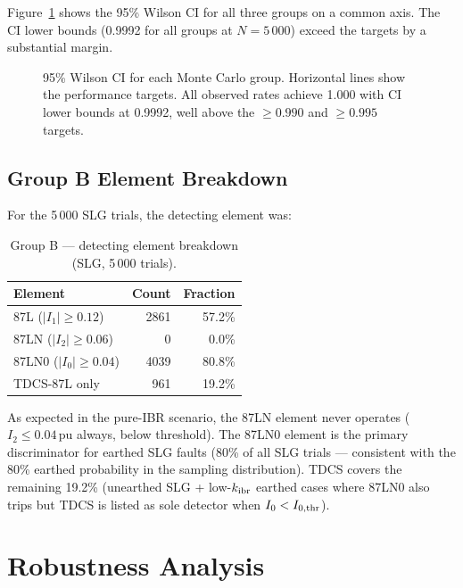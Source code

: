 \documentclass[11pt,a4paper]{article}
\begin{document}
Figure~\ref{fig:ci} shows the 95\% Wilson CI for all three groups
on a common axis.  The CI lower bounds (0.9992 for all groups at
$N = 5\,000$) exceed the targets by a substantial margin.

\begin{figure}[h!]
  \centering
  
  \caption{95\% Wilson CI for each Monte Carlo group.  Horizontal lines
           show the performance targets.  All observed rates achieve
           1.000 with CI lower bounds at 0.9992, well above the
           $\geq 0.990$ and $\geq 0.995$ targets.}
  \label{fig:ci}
\end{figure}

\subsection{Group B Element Breakdown}

For the 5\,000 SLG trials, the detecting element was:

\begin{table}[h!]
\centering
\caption{Group B — detecting element breakdown (SLG, 5\,000 trials).}
\label{tab:group_b}
\begin{tabular}{lrr}
\toprule
Element & Count & Fraction \\
\midrule
87L ($|I_1| \geq 0.12$)   & 2861 & 57.2\% \\
87LN ($|I_2| \geq 0.06$)  &    0 &  0.0\% \\
87LN0 ($|I_0| \geq 0.04$) & 4039 & 80.8\% \\
TDCS-87L only              &  961 & 19.2\% \\
\bottomrule
\end{tabular}
\end{table}

As expected in the pure-IBR scenario, the 87LN element never operates
($I_2 \leq 0.04$\,pu always, below threshold).  The 87LN0 element is the
primary discriminator for earthed SLG faults (80\% of all SLG trials —
consistent with the 80\% earthed probability in the sampling distribution).
TDCS covers the remaining 19.2\% (unearthed SLG + low-$k_{\rm ibr}$
earthed cases where 87LN0 also trips but TDCS is listed as sole detector
when $I_0 < I_{0,\rm thr}$).

\section{Robustness Analysis}
\end{document}
